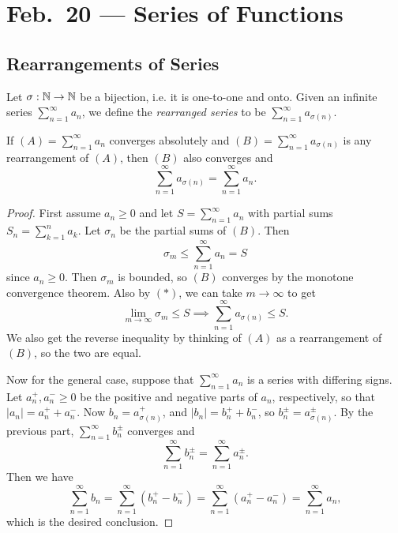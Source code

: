 \chapter{Feb.~20 --- Series of Functions}

\section{Rearrangements of Series}

\begin{definition}
  Let $\sigma : \mathbb{N} \to \mathbb{N}$ be a bijection, i.e. it is
  one-to-one and onto. Given an
  infinite series $\sum_{n = 1}^\infty a_n$, we define
  the \emph{rearranged series} to be $\sum_{n = 1}^\infty a_{\sigma(n)}$.
\end{definition}

\begin{theorem}[Dirichlet]
  If $(A) = \sum_{n = 1}^\infty a_n$ converges absolutely
  and $(B) = \sum_{n = 1}^\infty a_{\sigma(n)}$ is any
  rearrangement of $(A)$, then $(B)$ also converges and
  \[
    \sum_{n = 1}^\infty a_{\sigma(n)} = \sum_{n = 1}^\infty a_n.
  \]
\end{theorem}

\begin{proof}
  First assume $a_n \ge 0$ and let $S = \sum_{n = 1}^\infty a_n$
  with partial sums $S_n = \sum_{k = 1}^n a_k$. Let
  $\sigma_n$ be the partial sums of $(B)$. Then
  \[
    \sigma_m \le \sum_{n = 1}^\infty a_n = S \tag{$*$}\]
  since $a_n \ge 0$. Then $\sigma_m$ is bounded,
  so $(B)$ converges by the monotone convergence theorem.
  Also by $(*)$, we can take $m \to \infty$ to get
  \[
    \lim_{m \to \infty} \sigma_m \le S
    \implies \sum_{n = 1}^\infty a_{\sigma(n)} \le S.
  \]
  We also get the reverse inequality by thinking
  of $(A)$ as a rearrangement of $(B)$, so the two
  are equal.

  Now for the general case, suppose that
  $\sum_{n = 1}^\infty a_n$ is a series with differing
  signs. Let $a_n^+, a_n^- \ge 0$ be the positive
  and negative parts of $a_n$, respectively, so
  that $|a_n| = a_n^+ + a_n^-$. Now $b_n = a_{\sigma(n)}^+$,
  and $|b_n| = b_n^+ + b_n^-$, so
  $b_n^{\pm} = a_{\sigma(n)}^{\pm}$. By the previous
  part, $\sum_{n = 1}^\infty b_n^{\pm}$ converges and
  \[
    \sum_{n = 1}^\infty b_n^{\pm} = \sum_{n = 1}^\infty a_n^{\pm}.
  \]
  Then we have
  \[
    \sum_{n = 1}^\infty b_n
    = \sum_{n = 1}^\infty (b_n^+ - b_n^-)
    = \sum_{n = 1}^\infty (a_n^+ - a_n^-)
    = \sum_{n = 1}^\infty a_n,
  \]
  which is the desired conclusion.
\end{proof}

